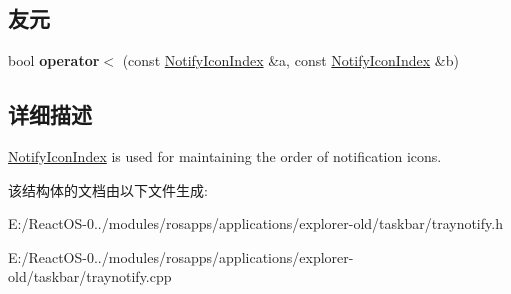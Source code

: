 \subsection*{友元}
\begin{DoxyCompactItemize}
\item 
\mbox{\label{struct_notify_icon_index_a1bd4effac8488bc135b51efb9bfe40a3}} 
bool {\bfseries operator$<$} (const \hyperlink{struct_notify_icon_index}{Notify\+Icon\+Index} \&a, const \hyperlink{struct_notify_icon_index}{Notify\+Icon\+Index} \&b)
\end{DoxyCompactItemize}


\subsection{详细描述}
\hyperlink{struct_notify_icon_index}{Notify\+Icon\+Index} is used for maintaining the order of notification icons. 

该结构体的文档由以下文件生成\+:\begin{DoxyCompactItemize}
\item 
E\+:/\+React\+O\+S-\/0../modules/rosapps/applications/explorer-\/old/taskbar/traynotify.\+h\item 
E\+:/\+React\+O\+S-\/0../modules/rosapps/applications/explorer-\/old/taskbar/traynotify.\+cpp\end{DoxyCompactItemize}
